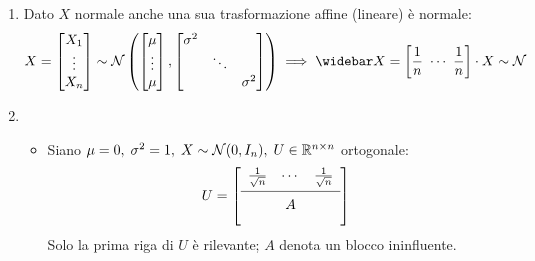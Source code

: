 \begin{dimo}
  \Fixvmode
  \begin{enumerate}
    \item Dato $X$ normale anche una sua trasformazione affine (lineare) è normale:
      $$X= \begin{bmatrix} X_1 \\ \vdots \\ X_n \end{bmatrix} \sim \Nc \left( \begin{bmatrix} \mu \\ \vdots \\ \mu  \end{bmatrix}, \begin{bmatrix}\sigma^2 & & \\ & \ddots & \\ & & \sigma^2 \end{bmatrix} \right)
      \implies \widebar X= \left[\frac{1}{n} \ \cdots \ \frac{1}{n} \right] \cdot X \sim \Nc$$
    \item \begin{itemize}
    \item Siano $\mu=0, \; \sigma^2=1, \; X \sim \mathcal N(0, I_n),\; U \in \mathbb R^{n \times n}$ ortogonale:
      $$U=\left[ \begin{array}{c c c} \frac{1}{\sqrt{n}} & \cdots & \frac{1}{\sqrt{n}} \vspace{3pt}\\ \hline \vspace{-8pt} \\ & A & \vspace{8pt}\end{array} \right]$$
    Solo la prima riga di $U$ è rilevante; $A$ denota un blocco ininfluente.


\end{itemize}
\end{enumerate}
\end{dimo}
